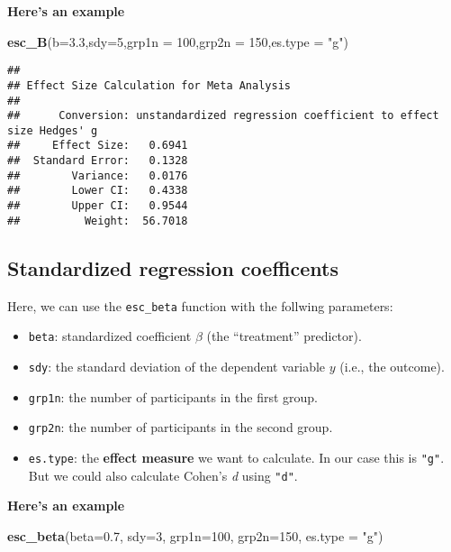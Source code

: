 \documentclass[]{book}
\newenvironment{Shaded}{\begin{snugshade}}{\end{snugshade}}
\newcommand{\KeywordTok}[1]{\textcolor[rgb]{0.13,0.29,0.53}{\textbf{#1}}}
\newcommand{\DataTypeTok}[1]{\textcolor[rgb]{0.13,0.29,0.53}{#1}}
\newcommand{\DecValTok}[1]{\textcolor[rgb]{0.00,0.00,0.81}{#1}}
\newcommand{\FloatTok}[1]{\textcolor[rgb]{0.00,0.00,0.81}{#1}}
\newcommand{\StringTok}[1]{\textcolor[rgb]{0.31,0.60,0.02}{#1}}
\newcommand{\NormalTok}[1]{#1}
\providecommand{\tightlist}{%
  \setlength{\itemsep}{0pt}\setlength{\parskip}{0pt}}
\theoremstyle{definition}
\theoremstyle{definition}
\theoremstyle{definition}
\theoremstyle{remark}
\begin{document}
\textbf{Here's an example}

\begin{Shaded}
\begin{Highlighting}[]
\KeywordTok{esc_B}\NormalTok{(}\DataTypeTok{b=}\FloatTok{3.3}\NormalTok{,}\DataTypeTok{sdy=}\DecValTok{5}\NormalTok{,}\DataTypeTok{grp1n =} \DecValTok{100}\NormalTok{,}\DataTypeTok{grp2n =} \DecValTok{150}\NormalTok{,}\DataTypeTok{es.type =} \StringTok{"g"}\NormalTok{)}
\end{Highlighting}
\end{Shaded}

\begin{verbatim}
## 
## Effect Size Calculation for Meta Analysis
## 
##      Conversion: unstandardized regression coefficient to effect size Hedges' g
##     Effect Size:   0.6941
##  Standard Error:   0.1328
##        Variance:   0.0176
##        Lower CI:   0.4338
##        Upper CI:   0.9544
##          Weight:  56.7018
\end{verbatim}

\subsection{Standardized regression
coefficents}\label{standardized-regression-coefficents}

Here, we can use the \texttt{esc\_beta} function with the follwing
parameters:

\begin{itemize}
\tightlist
\item
  \texttt{beta}: standardized coefficient \(\beta\) (the ``treatment''
  predictor).
\item
  \texttt{sdy}: the standard deviation of the dependent variable \(y\)
  (i.e., the outcome).
\item
  \texttt{grp1n}: the number of participants in the first group.
\item
  \texttt{grp2n}: the number of participants in the second group.
\item
  \texttt{es.type}: the \textbf{effect measure} we want to calculate. In
  our case this is \texttt{"g"}. But we could also calculate Cohen's
  \emph{d} using \texttt{"d"}.
\end{itemize}

\textbf{Here's an example}

\begin{Shaded}
\begin{Highlighting}[]
\KeywordTok{esc_beta}\NormalTok{(}\DataTypeTok{beta=}\FloatTok{0.7}\NormalTok{, }\DataTypeTok{sdy=}\DecValTok{3}\NormalTok{, }\DataTypeTok{grp1n=}\DecValTok{100}\NormalTok{, }\DataTypeTok{grp2n=}\DecValTok{150}\NormalTok{, }\DataTypeTok{es.type =} \StringTok{"g"}\NormalTok{)}
\end{Highlighting}
\end{Shaded}
\end{document}
